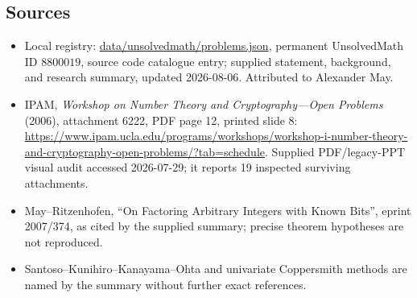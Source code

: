 \documentclass[11pt]{article}
\begin{document}
\subsection{Sources}
\begin{itemize}
\item Local registry: \url{data/unsolvedmath/problems.json}, permanent UnsolvedMath ID \(8800019\), source code catalogue entry; supplied statement, background, and research summary, updated 2026-08-06. Attributed to Alexander May.
\item IPAM, \emph{Workshop on Number Theory and Cryptography---Open Problems} (2006), attachment 6222, PDF page 12, printed slide 8: \url{https://www.ipam.ucla.edu/programs/workshops/workshop-i-number-theory-and-cryptography-open-problems/?tab=schedule}. Supplied PDF/legacy-PPT visual audit accessed 2026-07-29; it reports 19 inspected surviving attachments.
\item May--Ritzenhofen, ``On Factoring Arbitrary Integers with Known Bits'', eprint 2007/374, as cited by the supplied summary; precise theorem hypotheses are not reproduced.
\item Santoso--Kunihiro--Kanayama--Ohta and univariate Coppersmith methods are named by the summary without further exact references.
\end{itemize}
\end{document}
